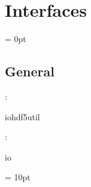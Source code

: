 
\section{Interfaces} 


\parskip = 0pt

\vspace{3mm} \subsection*{General}

: 

iohdf5util
\vspace{2mm}

: 

io
\vspace{2mm}

\vspace{5mm}\parskip = 10pt 
